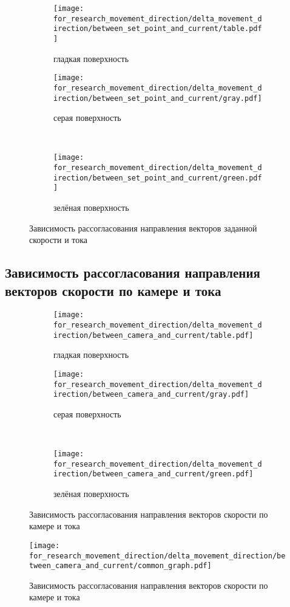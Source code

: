 \begin{figure}[H]
    \centering
    \begin{subfigure}{0.49\textwidth}
        \centering
        \texttt{[image: for\_research\_movement\_direction/delta\_movement\_direction/between\_set\_point\_and\_current/table.pdf]}
        \caption{гладкая поверхность}
    \end{subfigure}
    \hspace{0.005\textwidth}
    \begin{subfigure}{0.49\textwidth}
        \centering
        \texttt{[image: for\_research\_movement\_direction/delta\_movement\_direction/between\_set\_point\_and\_current/gray.pdf]}
        \caption{серая поверхность}
    \end{subfigure} \\
    \vspace{4pt}
    \centering
    \begin{subfigure}{0.49\textwidth}
        \centering
        \texttt{[image: for\_research\_movement\_direction/delta\_movement\_direction/between\_set\_point\_and\_current/green.pdf]}
        \caption{зелёная поверхность}
    \end{subfigure}
    \caption{Зависимость рассогласования направления векторов заданной скорости и тока}
\end{figure}

\subsection{Зависимость рассогласования направления векторов скорости по камере и тока}

\begin{figure}[H]
    \centering
    \begin{subfigure}{0.49\textwidth}
        \centering
        \texttt{[image: for\_research\_movement\_direction/delta\_movement\_direction/between\_camera\_and\_current/table.pdf]}
        \caption{гладкая поверхность}
    \end{subfigure}
    \hspace{0.005\textwidth}
    \begin{subfigure}{0.49\textwidth}
        \centering
        \texttt{[image: for\_research\_movement\_direction/delta\_movement\_direction/between\_camera\_and\_current/gray.pdf]}
        \caption{серая поверхность}
    \end{subfigure} \\
    \vspace{4pt}
    \centering
    \begin{subfigure}{0.49\textwidth}
        \centering
        \texttt{[image: for\_research\_movement\_direction/delta\_movement\_direction/between\_camera\_and\_current/green.pdf]}
        \caption{зелёная поверхность}
    \end{subfigure}
    \caption{Зависимость рассогласования направления векторов скорости по камере и тока}
\end{figure}

\begin{figure}[H]
    \centering
    \texttt{[image: for\_research\_movement\_direction/delta\_movement\_direction/between\_camera\_and\_current/common\_graph.pdf]}
    \caption{Зависимость рассогласования направления векторов скорости по камере и тока}
\end{figure}